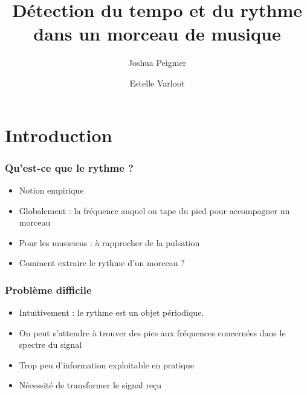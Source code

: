 \documentclass{beamer}
\title{\textbf{Détection du tempo et du rythme dans un morceau de musique}}
\author{Joshua Peignier \and Estelle Varloot}
\begin{document}
\frame{\titlepage}

\begin{frame}
       \tableofcontents
\end{frame}


\section{Introduction}
\begin{frame}
       \tableofcontents[currentsection]
\end{frame}


\begin{frame}
 \frametitle{Qu'est-ce que le rythme ?}
 \begin{itemize}
  \item<2-> Notion empirique 
  \item<4-> Globalement : la fréquence auquel on tape du pied pour accompagner un morceau
  \item<5-> Pour les musiciens : à rapprocher de la pulsation
  \item<6-> Comment extraire le rythme d'un morceau ?
 \end{itemize}
\end{frame}

\begin{frame}
 \frametitle{Problème difficile}
 \begin{itemize}
  \item Intuitivement : le rythme est un objet périodique.
  \item<2-> On peut s'attendre à trouver des pics aux fréquences concernées dans le spectre du signal
  \item<3-> Trop peu d'information exploitable en pratique
  \item<4-> Nécessité de transformer le signal reçu
 \end{itemize}
\end{frame}
\end{document}
